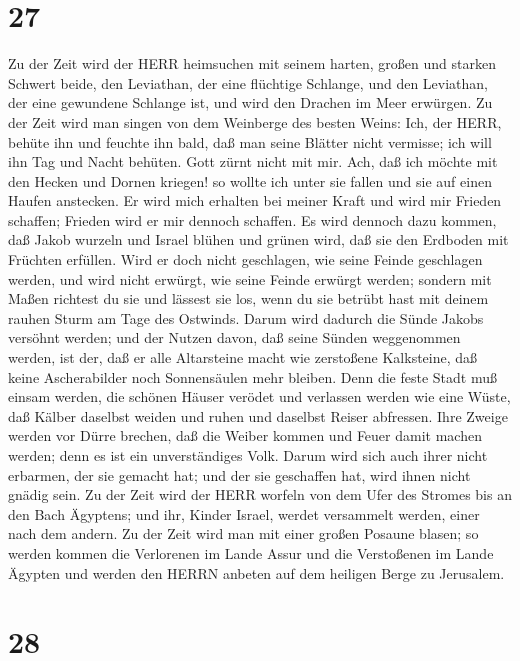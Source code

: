 \hypertarget{section-26}{%
\section{27}\label{section-26}}

 Zu der Zeit wird der HERR heimsuchen mit seinem harten,
großen und starken Schwert beide, den Leviathan, der eine flüchtige
Schlange, und den Leviathan, der eine gewundene Schlange ist, und wird
den Drachen im Meer erwürgen.  Zu der Zeit wird man singen
von dem Weinberge des besten Weins:  Ich, der HERR, behüte
ihn und feuchte ihn bald, daß man seine Blätter nicht vermisse; ich will
ihn Tag und Nacht behüten.  Gott zürnt nicht mit mir. Ach,
daß ich möchte mit den Hecken und Dornen kriegen! so wollte ich unter
sie fallen und sie auf einen Haufen anstecken.  Er wird mich
erhalten bei meiner Kraft und wird mir Frieden schaffen; Frieden wird er
mir dennoch schaffen.  Es wird dennoch dazu kommen, daß
Jakob wurzeln und Israel blühen und grünen wird, daß sie den Erdboden
mit Früchten erfüllen.  Wird er doch nicht geschlagen, wie
seine Feinde geschlagen werden, und wird nicht erwürgt, wie seine Feinde
erwürgt werden;  sondern mit Maßen richtest du sie und
lässest sie los, wenn du sie betrübt hast mit deinem rauhen Sturm am
Tage des Ostwinds.  Darum wird dadurch die Sünde Jakobs
versöhnt werden; und der Nutzen davon, daß seine Sünden weggenommen
werden, ist der, daß er alle Altarsteine macht wie zerstoßene
Kalksteine, daß keine Ascherabilder noch Sonnensäulen mehr bleiben.
 Denn die feste Stadt muß einsam werden, die schönen Häuser
verödet und verlassen werden wie eine Wüste, daß Kälber daselbst weiden
und ruhen und daselbst Reiser abfressen.  Ihre Zweige
werden vor Dürre brechen, daß die Weiber kommen und Feuer damit machen
werden; denn es ist ein unverständiges Volk. Darum wird sich auch ihrer
nicht erbarmen, der sie gemacht hat; und der sie geschaffen hat, wird
ihnen nicht gnädig sein.  Zu der Zeit wird der HERR worfeln
von dem Ufer des Stromes bis an den Bach Ägyptens; und ihr, Kinder
Israel, werdet versammelt werden, einer nach dem andern. 
Zu der Zeit wird man mit einer großen Posaune blasen; so werden kommen
die Verlorenen im Lande Assur und die Verstoßenen im Lande Ägypten und
werden den HERRN anbeten auf dem heiligen Berge zu Jerusalem.

\hypertarget{section-27}{%
\section{28}\label{section-27}}

